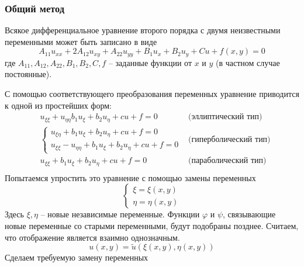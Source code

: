 \subsubsection{Общий метод}
Всякое дифференциальное уравнение второго порядка с двумя неизвестными переменными может быть записано в виде
\begin{equation}
	A_{11} u_{xx} + 2 A_{12} u_{xy} + A_{22} u_{yy} + B_1 u_x + B_2 u_y + C u + f(x, y) = 0
	\label{equ:equCannSource}
\end{equation}
где $A_{11}, A_{12}, A_{22}, B_1, B_2, C, f$ -- заданные функции от $x$ и $y$ (в частном случае постоянные).

С помощью соответствующего преобразования переменных уравнение приводится к одной из простейших форм:
\[
\begin{aligned}
			&u_{\xi \xi} + u_{\eta \eta} b_1 u_\xi + b_2 u_\eta + c u + f = 0& \mbox{(эллиптический тип)}\\
			&\begin{cases} u_{\xi \eta} + b_1 u_{\xi} + b_2 u_{\eta} + c u + f = 0\\
				u_{\xi \xi} - u_{\eta \eta} + b_1 u_{\xi} + b_2 u_\eta + c u + f = 0\end{cases}& \mbox{(гиперболический тип)}\\ 
			&u_{\xi \xi} + b_1 u_\xi + b_2 u_\eta + c u + f = 0& \mbox{(параболический тип)}\\
\end{aligned}
\]
Попытаемся упростить это уравнение с помощью замены переменных
\begin{equation}
	\begin{cases}
		\xi = \xi (x, y)\\
		\eta = \eta (x, y)
	\end{cases}
	\label{equ:equChangeVariables}
\end{equation}
Здесь $\xi, \eta$ -- новые независимые переменные. Функции $\varphi$ и $\psi$, связывающие новые переменные со старыми переменными, будут подобраны позднее. Считаем, что отображение является взаимно однозначным. 
\[
	u(x, y) = \tilde u (\xi (x, y), \eta (x, y))
\]
Сделаем требуемую замену переменных
